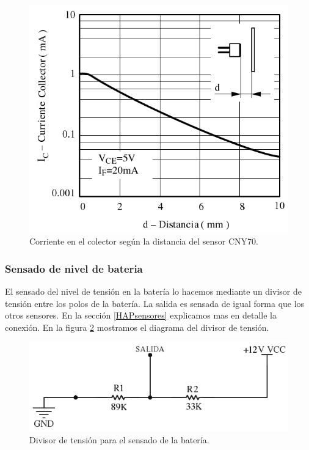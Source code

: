 	
	\begin{figure}[ht]
		\centering
		\includegraphics[scale=0.35]{piso-IxD.png}
		\caption{Corriente en el colector seg\'un la distancia del sensor CNY70.}
		\label{HFpisoID}
	\end{figure}

\subsubsection{Sensado de nivel de bateria}
\label{HSnivelBateria}

	El sensado del nivel de tensi\'on en la bater\'ia lo hacemos mediante un divisor de tensi\'on entre los polos de la bater\'ia.
	La salida es sensada de igual forma que los otros sensores. En la secci\'on \ref{HAPsensores} explicamos mas en detalle la conexi\'on.
	En la figura \ref{HFbateria} mostramos el diagrama del divisor de tensi\'on.
	
	\begin{figure}[ht]
		\centering
		\includegraphics[scale=0.35]{bateria.png}
		\caption{Divisor de tensi\'on para el sensado de la bater\'ia.}
		\label{HFbateria}
	\end{figure}
	
